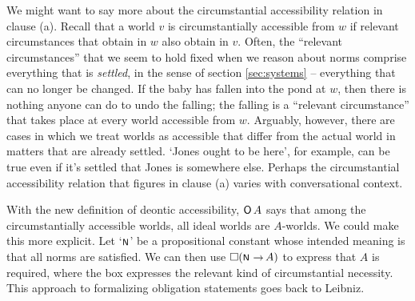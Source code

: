 We might want to say more about the circumstantial accessibility relation in
clause (a). Recall that a world $v$ is circumstantially accessible from $w$ if
relevant circumstances that obtain in $w$ also obtain in $v$. Often, the
``relevant circumstances'' that we seem to hold fixed when we reason about norms
comprise everything that is \emph{settled}, in the sense of section
\ref{sec:systems} -- everything that can no longer be changed. If the baby has
fallen into the pond at $w$, then there is nothing anyone can do to undo the
falling; the falling is a ``relevant circumstance'' that takes place at every
world accessible from $w$. Arguably, however, there are cases in which we treat
worlds as accessible that differ from the actual world in matters that are
already settled. `Jones ought to be here', for example, can be true even if it's
settled that Jones is somewhere else. Perhaps the circumstantial accessibility
relation that figures in clause (a) varies with conversational context.




With the new definition of deontic accessibility, $\operatorname{\mathsf{O}} A$ says that among the
circumstantially accessible worlds, all ideal worlds are $A$-worlds. We could
make this more explicit. Let `$\OK$' be a propositional constant whose intended
meaning is that all norms are satisfied. We can then use $\Box (\OK \to A)$ to
express that $A$ is required, where the box expresses the relevant kind of
circumstantial necessity. This approach to formalizing obligation statements
goes back to Leibniz.

